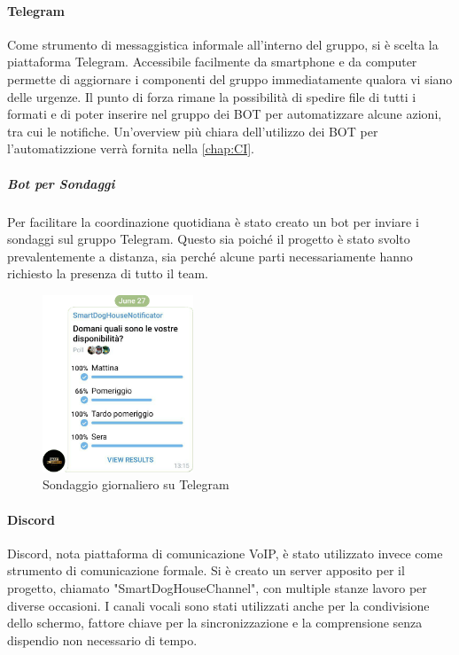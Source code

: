     \paragraph{Telegram}
    Come strumento di messaggistica informale all'interno del gruppo, si è scelta la piattaforma Telegram. Accessibile facilmente da smartphone e da computer permette di aggiornare i componenti del gruppo immediatamente qualora vi siano delle urgenze. Il punto di forza rimane la  possibilità di spedire file di tutti i formati e di poter inserire nel gruppo dei BOT per automatizzare alcune azioni, tra cui le notifiche. Un'overview più chiara dell'utilizzo dei BOT per l'automatizzione verrà fornita nella \autoref{chap:CI}.
    \subparagraph{Bot per Sondaggi} Per facilitare la coordinazione quotidiana è stato creato un bot per inviare i sondaggi sul gruppo Telegram. Questo sia poiché il progetto è stato svolto prevalentemente a distanza, sia perché alcune parti necessariamente hanno richiesto la presenza di tutto il team.
    \begin{figure}[H]
        \caption{Sondaggio giornaliero su Telegram}
        \centering
       \includegraphics[width=0.4\textwidth]{Images/pollTelegram.png}
    \end{figure}
    
    \paragraph{Discord}
    Discord, nota piattaforma di comunicazione VoIP, è stato utilizzato invece come strumento di comunicazione formale. Si è creato un server apposito per il progetto, chiamato "SmartDogHouseChannel", con multiple stanze lavoro per diverse occasioni.
    I canali vocali sono stati utilizzati anche per la condivisione dello schermo, fattore chiave per la sincronizzazione e la comprensione senza dispendio non necessario di tempo. 

